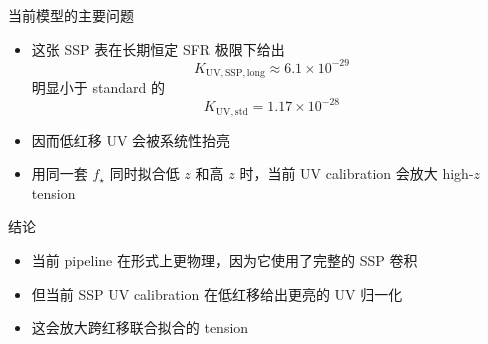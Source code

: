 \documentclass[aspectratio=169,11pt]{beamer}
\begin{document}
\begin{frame}{当前模型的主要问题}
\Large
\begin{itemize}
  \item 这张 SSP 表在长期恒定 SFR 极限下给出
  \[
    K_{\mathrm{UV,SSP,long}} \approx 6.1\times 10^{-29}
  \]
  明显小于 standard 的
  \[
    K_{\mathrm{UV,std}} = 1.17\times 10^{-28}
  \]
  \item 因而低红移 UV 会被系统性抬亮
  \item 用同一套 \(f_\star\) 同时拟合低 \(z\) 和高 \(z\) 时，当前 UV calibration 会放大 high-\(z\) tension
\end{itemize}
\end{frame}

\begin{frame}{结论}
\Large
\begin{itemize}
  \item 当前 pipeline 在形式上更物理，因为它使用了完整的 SSP 卷积
  \item 但当前 SSP UV calibration 在低红移给出更亮的 UV 归一化
  \item 这会放大跨红移联合拟合的 tension
\end{itemize}
\end{frame}
\end{document}
